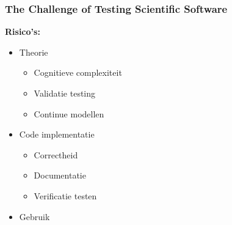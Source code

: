 \documentclass[10pt]{beamer}
\begin{document}
	\begin{frame}
		\frametitle{The Challenge of Testing Scientific Software}
		\textbf{Risico's:}
		\begin{itemize}
			\item Theorie
			\begin{itemize}
				\item Cognitieve complexiteit
				\item Validatie testing
				\item Continue modellen
			\end{itemize}
			\item Code implementatie
			\begin{itemize}
				\item Correctheid
				\item Documentatie
				\item Verificatie testen
			\end{itemize}
			\item Gebruik
		\end{itemize}
	\end{frame}
\end{document}
